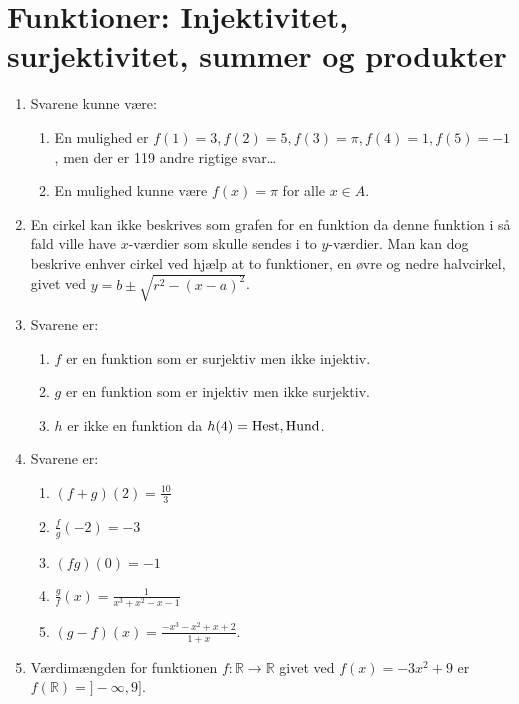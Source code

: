 \newpage
\section{Funktioner: Injektivitet, surjektivitet, summer og produkter}
\begin{enumerate}
	\item  Svarene kunne være:
	\begin{enumerate}
		\item En mulighed er $ f(1)=3,f(2)=5,f(3)=\pi,f(4)=1,f(5)=-1 $, men der er 119 andre rigtige svar\dots
		\item En mulighed kunne være $f(x)=\pi$ for alle $x\in A$.
	\end{enumerate}
	
	
	\item En cirkel kan ikke beskrives som grafen for en funktion da denne funktion i så fald ville have $x$-værdier som skulle sendes i to $y$-værdier. Man kan dog beskrive enhver cirkel ved hjælp at to funktioner, en øvre og nedre halvcirkel, givet ved $y=b\pm \sqrt{r^2-(x-a)^2}$. 
	
	\item Svarene er:
	\begin{enumerate}
		\item $f$ er en funktion som er surjektiv men ikke injektiv.
		\item $g$ er en funktion som er injektiv men ikke surjektiv.
		\item $h$ er ikke en funktion da $h(4)=\textup{Hest},\textup{Hund}$.
	\end{enumerate}

	\item Svarene er:
	\begin{enumerate}
		\item $(f+g)(2)=\frac{10}{3}$
		\item $ \frac{f}{g}(-2) =-3$
		\item $(fg)(0)=-1$
		\item $\frac{g}{f}(x)=\frac{1}{x^3+x^2-x-1}$
		\item $(g-f)(x)=\frac{-x^3-x^2+x+2}{1+x}$.
	\end{enumerate}

	\item Værdimængden for funktionen $f\colon \mathbb{R}\to \mathbb{R}$ givet ved $f(x)=-3x^2+9$ er $f(\mathbb{R})=]-\infty,9]$.
	

\end{enumerate}
